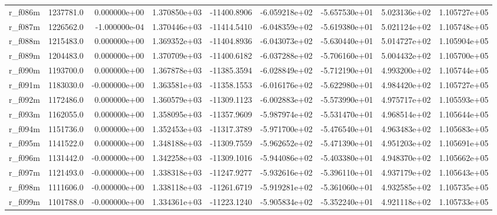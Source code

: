 \documentclass[12pt]{article}
\begin{document}
\begin{landscape}
\begin{longtable}{|l|r|r|r|r|r|r|r|r|}
r\_f086m                 &  1237781.0 &  0.000000e+00 &  1.370850e+03 & -11400.8906 & -6.059218e+02 & -5.657530e+01 &  5.023136e+02 &  1.105727e+05 \\
r\_f087m                 &  1226562.0 & -1.000000e-04 &  1.370446e+03 & -11414.5410 & -6.048359e+02 & -5.619380e+01 &  5.021124e+02 &  1.105748e+05 \\
r\_f088m                 &  1215483.0 &  0.000000e+00 &  1.369352e+03 & -11404.8936 & -6.043073e+02 & -5.630440e+01 &  5.014727e+02 &  1.105904e+05 \\
r\_f089m                 &  1204483.0 &  0.000000e+00 &  1.370709e+03 & -11400.6182 & -6.037288e+02 & -5.706160e+01 &  5.004432e+02 &  1.105700e+05 \\
r\_f090m                 &  1193700.0 &  0.000000e+00 &  1.367878e+03 & -11385.3594 & -6.028849e+02 & -5.712190e+01 &  4.993200e+02 &  1.105744e+05 \\
r\_f091m                 &  1183030.0 & -0.000000e+00 &  1.363581e+03 & -11358.1553 & -6.016176e+02 & -5.622980e+01 &  4.984420e+02 &  1.105727e+05 \\
r\_f092m                 &  1172486.0 &  0.000000e+00 &  1.360579e+03 & -11309.1123 & -6.002883e+02 & -5.573990e+01 &  4.975717e+02 &  1.105593e+05 \\
r\_f093m                 &  1162055.0 &  0.000000e+00 &  1.358095e+03 & -11357.9609 & -5.987974e+02 & -5.531470e+01 &  4.968514e+02 &  1.105644e+05 \\
r\_f094m                 &  1151736.0 &  0.000000e+00 &  1.352453e+03 & -11317.3789 & -5.971700e+02 & -5.476540e+01 &  4.963483e+02 &  1.105683e+05 \\
r\_f095m                 &  1141522.0 &  0.000000e+00 &  1.348188e+03 & -11309.7559 & -5.962652e+02 & -5.471390e+01 &  4.951203e+02 &  1.105691e+05 \\
r\_f096m                 &  1131442.0 & -0.000000e+00 &  1.342258e+03 & -11309.1016 & -5.944086e+02 & -5.403380e+01 &  4.948370e+02 &  1.105662e+05 \\
r\_f097m                 &  1121493.0 & -0.000000e+00 &  1.338318e+03 & -11247.9277 & -5.932616e+02 & -5.396110e+01 &  4.937179e+02 &  1.105643e+05 \\
r\_f098m                 &  1111606.0 & -0.000000e+00 &  1.338118e+03 & -11261.6719 & -5.919281e+02 & -5.361060e+01 &  4.932585e+02 &  1.105735e+05 \\
r\_f099m                 &  1101788.0 & -0.000000e+00 &  1.334361e+03 & -11223.1240 & -5.905834e+02 & -5.352240e+01 &  4.921118e+02 &  1.105733e+05 \\

\end{longtable}
\end{landscape}
\end{document}
